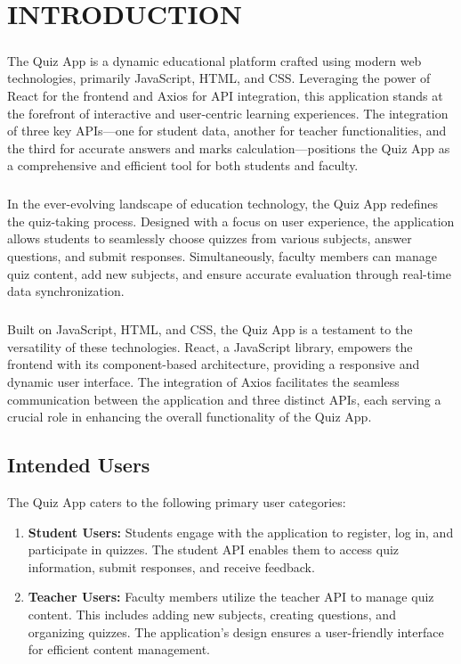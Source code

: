 \chapter{INTRODUCTION}

\large{\paragraph{}
The Quiz App is a dynamic educational platform crafted using modern web technologies, primarily JavaScript, HTML, and CSS. Leveraging the power of React for the frontend and Axios for API integration, this application stands at the forefront of interactive and user-centric learning experiences. The integration of three key APIs—one for student data, another for teacher functionalities, and the third for accurate answers and marks calculation—positions the Quiz App as a comprehensive and efficient tool for both students and faculty.}

\large{\paragraph{}
In the ever-evolving landscape of education technology, the Quiz App redefines the quiz-taking process. Designed with a focus on user experience, the application allows students to seamlessly choose quizzes from various subjects, answer questions, and submit responses. Simultaneously, faculty members can manage quiz content, add new subjects, and ensure accurate evaluation through real-time data synchronization.}

\large{\paragraph{}
Built on JavaScript, HTML, and CSS, the Quiz App is a testament to the versatility of these technologies. React, a JavaScript library, empowers the frontend with its component-based architecture, providing a responsive and dynamic user interface. The integration of Axios facilitates the seamless communication between the application and three distinct APIs, each serving a crucial role in enhancing the overall functionality of the Quiz App.}

\section{Intended Users}
The Quiz App caters to the following primary user categories:

\begin{enumerate}
    \item \textbf{Student Users:} Students engage with the application to register, log in, and participate in quizzes. The student API enables them to access quiz information, submit responses, and receive feedback.

    \item \textbf{Teacher Users:} Faculty members utilize the teacher API to manage quiz content. This includes adding new subjects, creating questions, and organizing quizzes. The application's design ensures a user-friendly interface for efficient content management.

\end{enumerate}

